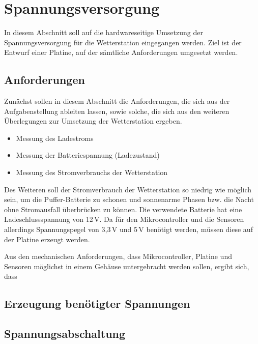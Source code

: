 \section{Spannungsversorgung}\label{sec.spannungsversorgung}
In diesem Abschnitt soll auf die hardwareseitige Umsetzung der Spannungsversorgung für die Wetterstation eingegangen werden. Ziel ist der Entwurf einer Platine, auf der sämtliche Anforderungen umgesetzt werden.

\subsection{Anforderungen}\label{subsec.anforderungen}
Zunächst sollen in diesem Abschnitt die Anforderungen, die sich aus der Aufgabenstellung ableiten lassen, sowie solche, die sich aus den weiteren Überlegungen zur Umsetzung der Wetterstation ergeben.

\begin{itemize}

	\item Messung des Ladestroms
	\item Messung der Batteriespannung (Ladezustand)
	\item Messung des Stromverbrauchs der Wetterstation

\end{itemize}

Des Weiteren soll der Stromverbrauch der Wetterstation so niedrig wie möglich sein, um die Puffer-Batterie zu schonen und sonnenarme Phasen bzw. die Nacht ohne Stromausfall überbrücken zu können. Die verwendete Batterie hat eine Ladeschlussspannung von 12\,V. Da für den Mikrocontroller und die Sensoren allerdings Spannungspegel von 3,3\,V und 5\,V benötigt werden, müssen diese auf der Platine erzeugt werden.

Aus den mechanischen Anforderungen, dass Mikrocontroller, Platine und Sensoren möglichst in einem Gehäuse untergebracht werden sollen, ergibt sich, dass 
\subsection{Erzeugung benötigter Spannungen}\label{subsec.Spannungserzeugung}

\subsection{Spannungsabschaltung}\label{subsec.Spannungsabschaltung}

